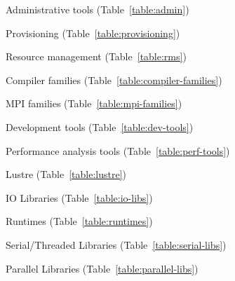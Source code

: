 \vspace*{0.1cm}

\begin{itemize*}
\item Administrative tools (Table~\ref{table:admin})
\item Provisioning (Table~\ref{table:provisioning})
\fi
\item Resource management (Table~\ref{table:rms})
\item Compiler families (Table~\ref{table:compiler-families})
\item MPI families (Table~\ref{table:mpi-families})
\item Development tools (Table~\ref{table:dev-tools})
\item Performance analysis tools (Table~\ref{table:perf-tools})
\item Lustre (Table~\ref{table:lustre})
\fi

\item IO Libraries (Table~\ref{table:io-libs})
\item Runtimes (Table~\ref{table:runtimes})
\item Serial/Threaded Libraries (Table~\ref{table:serial-libs})
\item Parallel Libraries (Table~\ref{table:parallel-libs})
\end{itemize*}
